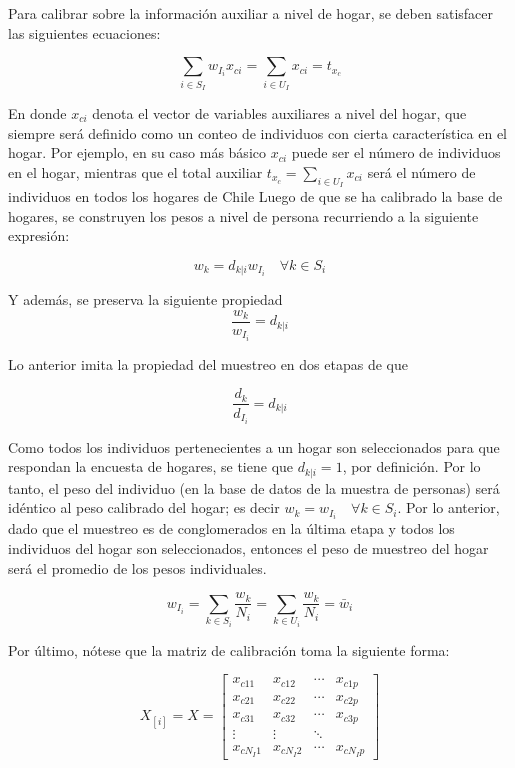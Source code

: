 \documentclass[12pt,spanish,]{book}
\begin{document}
Para calibrar sobre la información auxiliar a nivel de hogar, se deben satisfacer las siguientes ecuaciones:

\[
\sum_{i \in S_I}w_{I_i}x_{ci} = \sum_{i \in U_I}x_{ci} = t_{x_c}
\]

En donde \(x_{ci}\) denota el vector de variables auxiliares a nivel del hogar, que siempre será definido como un conteo de individuos con cierta característica en el hogar. Por ejemplo, en su caso más básico \(x_{ci}\) puede ser el número de individuos en el hogar, mientras que el total auxiliar \(t_{x_c} = \sum_{i \in U_I}x_{ci}\) será el número de individuos en todos los hogares de Chile Luego de que se ha calibrado la base de hogares, se construyen los pesos a nivel de persona recurriendo a la siguiente expresión:

\[
w_k = d_{k|i}w_{I_i} \quad \forall k \in S_i
\]

Y además, se preserva la siguiente propiedad
\[
\frac{w_k}{w_{I_i}}=d_{k|i}
\]

Lo anterior imita la propiedad del muestreo en dos etapas de que

\[
\frac{d_k}{d_{I_i}}=d_{k|i}
\]

Como todos los individuos pertenecientes a un hogar son seleccionados para que respondan la encuesta de hogares, se tiene que \(d_{k|i} = 1\), por definición. Por lo tanto, el peso del individuo (en la base de datos de la muestra de personas) será idéntico al peso calibrado del hogar; es decir \(w_k = w_{I_i} \quad \forall k \in S_i\). Por lo anterior, dado que el muestreo es de conglomerados en la última etapa y todos los individuos del hogar son seleccionados, entonces el peso de muestreo del hogar será el promedio de los pesos individuales.

\[
w_{I_i}=\sum_{k\in S_i}\frac{w_k}{N_i}=\sum_{k\in U_i}\frac{w_k}{N_i}=\bar{w}_i
\]

Por último, nótese que la matriz de calibración toma la siguiente forma:

\[
X_{[i]}=X=
\begin{bmatrix}
x_{c11} & x_{c12} & \cdots & x_{c1p}\\
x_{c21} & x_{c22} & \cdots & x_{c2p}\\
x_{c31} & x_{c32} & \cdots & x_{c3p}\\
\vdots  & \vdots & \ddots &\\
x_{cN_I1} & x_{cN_I2} & \cdots & x_{cN_Ip}
\end{bmatrix}
\]
\end{document}
